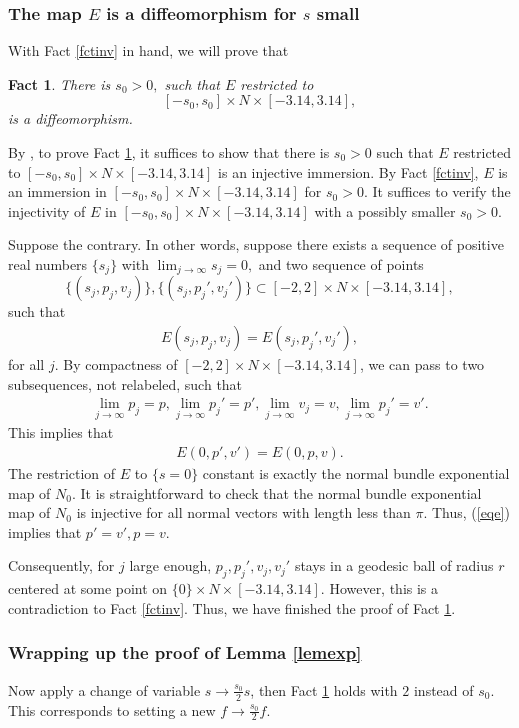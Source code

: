 \documentclass[11pt,a4paper]{amsart}
\numberwithin{equation}{section}
\newcommand{\s}{\subset}
\theoremstyle{plain}
\newtheorem{fact}[exam]{Fact}
\theoremstyle{definition}
\numberwithin{equation}{subsection}
\begin{document}
\subsubsection{The map $E$ is a diffeomorphism for $s$ small}
With Fact \ref{fctinv} in hand, we will prove that
\begin{fact}\label{fctdiff}
There is $s_0>0,$ such that $E$ restricted to $$[-s_0,s_0]\times N\times[-3.14,3.14],$$
is a diffeomorphism.
\end{fact}
By \cite[Proposition 4.22(c)]{JL}, to prove Fact \ref{fctdiff}, it suffices to show that there is $s_0>0$ such that $E$ restricted to $[-s_0,s_0]\times N\times[-3.14,3.14]$ is an injective immersion. By Fact \ref{fctinv}, $E$ is an immersion in  $[-s_0,s_0]\times N\times[-3.14,3.14]$ for $s_0>0.$ It suffices to verify the injectivity of $E$ in $[-s_0,s_0]\times N\times[-3.14,3.14]$ with a possibly smaller $s_0>0.$

Suppose the contrary. In other words, suppose there exists a sequence of positive real numbers $\{s_j\}$ with $\lim_{j\to\infty}s_j=0,$ and two sequence of points $$\{(s_j,p_j,v_j)\},\{(s_j,p_j',v_j')\}\s [-2,2]\times N\times [-3.14,3.14],$$
such that 
\begin{align*}
E(s_j,p_j,v_j)=E(s_j,p_j',v_j'),
\end{align*}for all $j.$
By compactness of $[-2,2]\times N\times [-3.14,3.14]$, we can pass to two subsequences, not relabeled, such that
\begin{align*}
\lim_{j\to\infty}p_j=p,\lim_{j\to\infty}p_j'=p',
\lim_{j\to\infty}v_j=v,\lim_{j\to\infty}p_j'=v'.
\end{align*}
This implies that
\begin{align}\label{eqe}
E(0,p',v')=E(0,p,v).
\end{align}
The restriction of $E$ to $\{s=0\}$ constant is exactly the normal bundle exponential map of $N_{0}$. It is straightforward to check that the normal bundle exponential map of $N_0$ is injective for all normal vectors with length less than $\pi.$  Thus, (\ref{eqe}) implies that $p'=v',p=v.$

Consequently, for $j$ large enough, $p_j,p_j',v_j,v_j'$ stays in a geodesic ball of radius $r$ centered at some point on $\{0\}\times N\times[-3.14,3.14].$ However, this is a contradiction to Fact \ref{fctinv}. Thus, we have finished the proof of Fact \ref{fctdiff}.
\subsubsection{Wrapping up the proof of Lemma \ref{lemexp}}
Now apply a change of variable $s\to \frac{s_0}{2}s$, then Fact \ref{fctdiff} holds with $2$ instead of $s_0.$ This corresponds to setting a new $f\to \frac{s_0}{2}f.$ 
\end{document}
